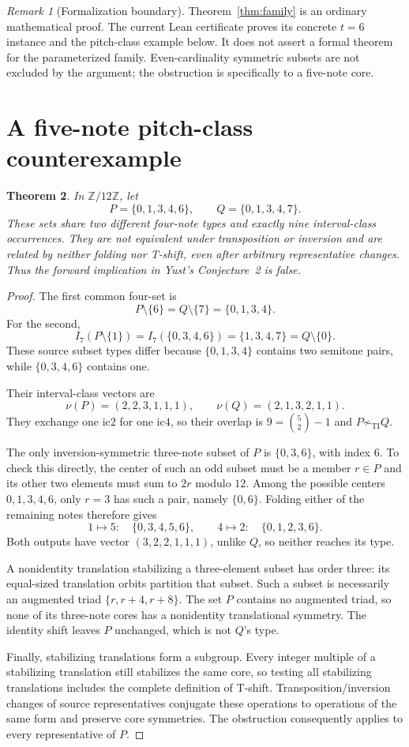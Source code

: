 \documentclass[10pt]{article}
\newtheorem{theorem}{Theorem}
\theoremstyle{remark}
\newtheorem{remark}[theorem]{Remark}
\newcommand{\Z}{\mathbb Z}
\newcommand{\ti}{\sim_{\mathrm{TI}}}
\begin{document}
\begin{remark}[Formalization boundary]
Theorem~\ref{thm:family} is an ordinary mathematical proof. The current Lean
certificate proves its concrete $t=6$ instance and the pitch-class example
below. It does not assert a formal theorem for the parameterized family.
Even-cardinality symmetric subsets are not excluded by the argument; the
obstruction is specifically to a five-note core.
\end{remark}

\section{A five-note pitch-class counterexample}
\begin{theorem}\label{thm:pc}
In $\Z/12\Z$, let
\[
 P=\{0,1,3,4,6\},\qquad Q=\{0,1,3,4,7\}.
\]
These sets share two different four-note types and exactly nine interval-class
occurrences. They are not equivalent under transposition or inversion and are related
by neither folding nor T-shift, even after arbitrary representative changes.
Thus the forward implication in Yust's Conjecture~2 is false.
\end{theorem}
\begin{proof}
The first common four-set is
\[
 P\setminus\{6\}=Q\setminus\{7\}=\{0,1,3,4\}.
\]
For the second,
\[
 I_7(P\setminus\{1\})=I_7(\{0,3,4,6\})
 =\{1,3,4,7\}=Q\setminus\{0\}.
\]
These source subset types differ because $\{0,1,3,4\}$ contains two
semitone pairs, while $\{0,3,4,6\}$ contains one.

Their interval-class vectors are
\[
 \nu(P)=(2,2,3,1,1,1),\qquad
 \nu(Q)=(2,1,3,2,1,1).
\]
They exchange one ic$2$ for one ic$4$, so their overlap is
$9=\binom52-1$ and $P\not\ti Q$.

The only inversion-symmetric three-note subset of $P$ is $\{0,3,6\}$,
with index $6$. To check this directly, the center of such an odd subset
must be a member $r\in P$ and its other two elements must sum to $2r$
modulo $12$. Among the possible centers $0,1,3,4,6$, only $r=3$
has such a pair, namely $\{0,6\}$. Folding either of the remaining notes
therefore gives
\[
 1\longmapsto5:\quad\{0,3,4,5,6\},\qquad
 4\longmapsto2:\quad\{0,1,2,3,6\}.
\]
Both outputs have vector $(3,2,2,1,1,1)$, unlike $Q$, so neither reaches
its type.

A nonidentity translation stabilizing a three-element subset has order
three: its equal-sized translation orbits partition that subset. Such a
subset is necessarily an augmented triad $\{r,r+4,r+8\}$. The set $P$
contains no augmented triad, so none of its three-note cores has a
nonidentity translational symmetry. The identity shift leaves $P$
unchanged, which is not $Q$'s type.

Finally, stabilizing translations form a subgroup. Every integer multiple
of a stabilizing translation still stabilizes the same core, so testing all
stabilizing translations includes the complete definition of T-shift.
Transposition/inversion changes of source representatives conjugate these
operations to operations of the same form and preserve core symmetries.
The obstruction consequently applies to every representative of $P$.
\end{proof}
\end{document}

